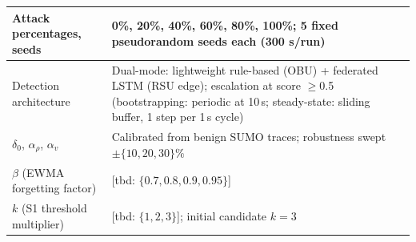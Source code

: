 \documentclass[12pt, a4paper]{report}
\begin{document}
{{\begin{longtable}{|m{5.0cm}|m{9.0cm}|}
            \hline
            Attack percentages, seeds & 0\%, 20\%, 40\%, 60\%, 80\%, 100\%; 5 fixed pseudorandom seeds each (300 s/run) \\
            \hline
            Detection architecture & Dual-mode: lightweight rule-based (OBU) + federated LSTM (RSU edge); escalation at score $\geq$0.5 (bootstrapping: periodic at 10\,s; steady-state: sliding buffer, 1 step per 1\,s cycle) \\
            \hline
            $\delta_0$, $\alpha_\rho$, $\alpha_v$ &
  Calibrated from benign SUMO traces;
  robustness swept $\pm\{10,20,30\}\%$ \\
  \hline
 $\beta$ (EWMA forgetting factor) &
   [tbd: $\{0.7, 0.8, 0.9, 0.95\}$] \\
   \hline
 $k$ (S1 threshold multiplier) &
   [tbd: $\{1, 2, 3\}$]; initial candidate $k{=}3$ \\


\end{longtable}}}
\end{document}
